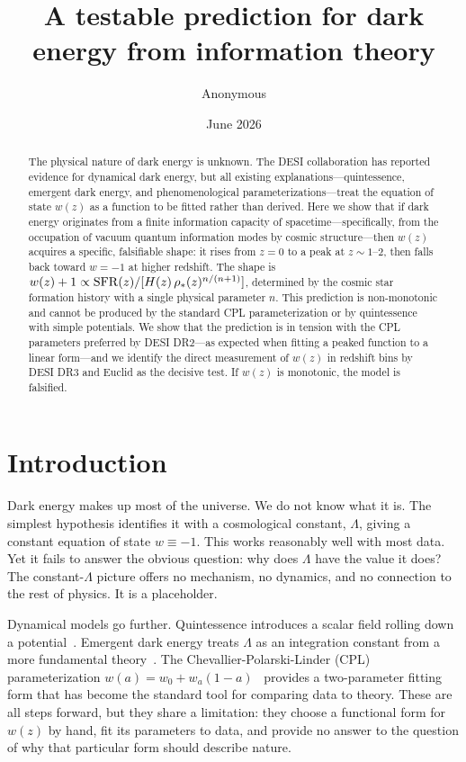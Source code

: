 \documentclass[12pt,a4paper]{article}
\begin{document}
\title{\bf A testable prediction for dark energy from information theory}

\author{Anonymous}
\date{June 2026}

\maketitle

\begin{abstract}
The physical nature of dark energy is unknown. The DESI collaboration has reported evidence for dynamical dark energy, but all existing explanations---quintessence, emergent dark energy, and phenomenological parameterizations---treat the equation of state $w(z)$ as a function to be fitted rather than derived. Here we show that if dark energy originates from a finite information capacity of spacetime---specifically, from the occupation of vacuum quantum information modes by cosmic structure---then $w(z)$ acquires a specific, falsifiable shape: it rises from $z=0$ to a peak at $z\sim1$--$2$, then falls back toward $w=-1$ at higher redshift. The shape is $w(z)+1\propto{\rm SFR}(z)/[H(z)\,\rho_*(z)^{n/(n+1)}]$, determined by the cosmic star formation history with a single physical parameter $n$. This prediction is non-monotonic and cannot be produced by the standard CPL parameterization or by quintessence with simple potentials. We show that the prediction is in tension with the CPL parameters preferred by DESI DR2---as expected when fitting a peaked function to a linear form---and we identify the direct measurement of $w(z)$ in redshift bins by DESI DR3 and Euclid as the decisive test. If $w(z)$ is monotonic, the model is falsified.
\end{abstract}

\section*{Introduction}

Dark energy makes up most of the universe. We do not know what it is. The simplest hypothesis identifies it with a cosmological constant, $\Lambda$, giving a constant equation of state $w\equiv-1$. This works reasonably well with most data. Yet it fails to answer the obvious question: why does $\Lambda$ have the value it does? The constant-$\Lambda$ picture offers no mechanism, no dynamics, and no connection to the rest of physics. It is a placeholder.

Dynamical models go further. Quintessence introduces a scalar field rolling down a potential~\cite{tsujikawa2013}. Emergent dark energy treats $\Lambda$ as an integration constant from a more fundamental theory~\cite{li2024}. The Chevallier-Polarski-Linder (CPL) parameterization $w(a)=w_0+w_a(1-a)$~\cite{chevallier2001} provides a two-parameter fitting form that has become the standard tool for comparing data to theory. These are all steps forward, but they share a limitation: they choose a functional form for $w(z)$ by hand, fit its parameters to data, and provide no answer to the question of why that particular form should describe nature.
\end{document}
